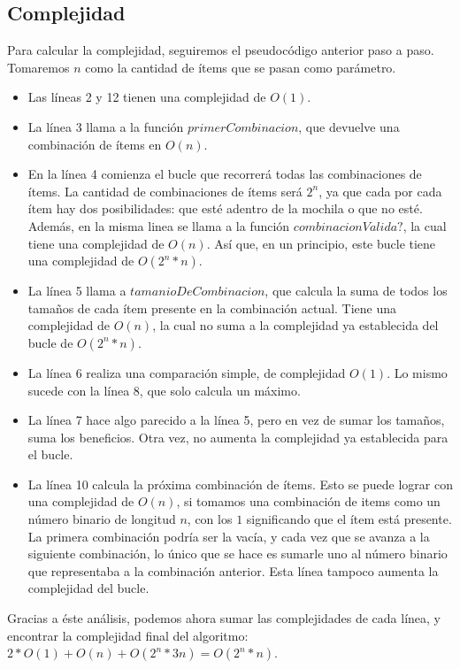 \documentclass[10pt, a4paper]{article}
\begin{document}
\subsection{Complejidad}
Para calcular la complejidad, seguiremos el pseudocódigo anterior paso a paso. Tomaremos $n$ como la cantidad de ítems que se pasan como parámetro.\par
\begin{itemize}
	\item Las líneas 2 y 12 tienen una complejidad de $O(1)$.
	\item La línea 3 llama a la función $primerCombinacion$, que devuelve una combinación de ítems en $O(n)$.
	\item En la línea 4 comienza el bucle que recorrerá todas las combinaciones de ítems. La cantidad de combinaciones de ítems será $2^n$, ya que cada por cada ítem hay dos posibilidades: que esté adentro de la mochila o que no esté. Además, en la misma linea se llama a la función $combinacionValida?$, la cual tiene una complejidad de $O(n)$. Así que, en un principio, este bucle tiene una complejidad de $O(2^n * n)$.
	\item La línea 5 llama a $tamanioDeCombinacion$, que calcula la suma de todos los tamaños de cada ítem presente en la combinación actual. Tiene una complejidad de $O(n)$, la cual no suma a la complejidad ya establecida del bucle de $O(2^n * n)$.
	\item La línea 6 realiza una comparación simple, de complejidad $O(1)$. Lo mismo sucede con la línea 8, que solo calcula un máximo.
	\item La línea 7 hace algo parecido a la línea 5, pero en vez de sumar los tamaños, suma los beneficios. Otra vez, no aumenta la complejidad ya establecida para el bucle.
	\item La línea 10 calcula la próxima combinación de ítems. Esto se puede lograr con una complejidad de $O(n)$, si tomamos una combinación de items como un número binario de longitud $n$, con los $1$ significando que el ítem está presente. La primera combinación podría ser la vacía, y cada vez que se avanza a la siguiente combinación, lo único que se hace es sumarle uno al número binario que representaba a la combinación anterior. Esta línea tampoco aumenta la complejidad del bucle.
\end{itemize}
Gracias a éste análisis, podemos ahora sumar las complejidades de cada línea, y encontrar la complejidad final del algoritmo: $2 * O(1) + O(n) + O(2^n * 3n) = O(2^n * n)$.
\end{document}
